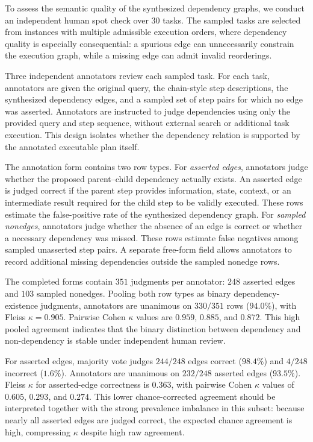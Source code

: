 \documentclass{article}
\begin{document}
To assess the semantic quality of the synthesized dependency graphs, we conduct
an independent human spot check over \(30\) tasks. The sampled tasks are selected
from instances with multiple admissible execution orders, where dependency
quality is especially consequential: a spurious edge can unnecessarily constrain
the execution graph, while a missing edge can admit invalid reorderings.

Three independent annotators review each sampled task. For each task, annotators
are given the original query, the chain-style step descriptions, the synthesized
dependency edges, and a sampled set of step pairs for which no edge was asserted.
Annotators are instructed to judge dependencies using only the provided query and
step sequence, without external search or additional task execution. This design
isolates whether the dependency relation is supported by the annotated executable
plan itself.

The annotation form contains two row types. For \emph{asserted edges},
annotators judge whether the proposed parent--child dependency actually exists.
An asserted edge is judged correct if the parent step provides information,
state, context, or an intermediate result required for the child step to be
validly executed. These rows estimate the false-positive rate of the synthesized
dependency graph. For \emph{sampled nonedges}, annotators judge whether the
absence of an edge is correct or whether a necessary dependency was missed.
These rows estimate false negatives among sampled unasserted step pairs. A
separate free-form field allows annotators to record additional missing
dependencies outside the sampled nonedge rows.

The completed forms contain \(351\) judgments per annotator: \(248\) asserted
edges and \(103\) sampled nonedges. Pooling both row types as binary
dependency-existence judgments, annotators are unanimous on \(330/351\) rows
(\(94.0\%\)), with Fleiss \(\kappa=0.905\). Pairwise Cohen \(\kappa\) values are
\(0.959\), \(0.885\), and \(0.872\). This high pooled agreement indicates that
the binary distinction between dependency and non-dependency is stable under
independent human review.

For asserted edges, majority vote judges \(244/248\) edges correct
(\(98.4\%\)) and \(4/248\) incorrect (\(1.6\%\)). Annotators are unanimous on
\(232/248\) asserted edges (\(93.5\%\)). Fleiss \(\kappa\) for asserted-edge
correctness is \(0.363\), with pairwise Cohen \(\kappa\) values of \(0.605\),
\(0.293\), and \(0.274\). This lower chance-corrected agreement should be
interpreted together with the strong prevalence imbalance in this subset:
because nearly all asserted edges are judged correct, the expected chance
agreement is high, compressing \(\kappa\) despite high raw agreement.
\end{document}
